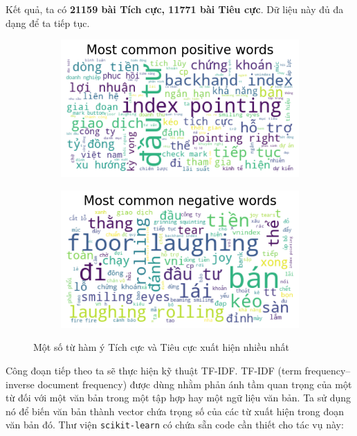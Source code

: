 Kết quả, ta có \textbf{21159 bài Tích cực, 11771 bài Tiêu cực}. Dữ liệu này đủ đa dạng để ta tiếp tục. 
\begin{figure}[H]
  \begin{subfigure}{.5\textwidth}
  \centering
    \includegraphics[width=1\linewidth]{images/plot-5.8-commonpos.png}
  \end{subfigure}%
  \begin{subfigure}{.5\textwidth}
  \centering
    \includegraphics[width=1\linewidth]{images/plot-5.9-commonneg.png}
  \end{subfigure}
  \vspace{-2em}
  \caption{Một số từ hàm ý Tích cực và Tiêu cực xuất hiện nhiều nhất}
  \label{fig:5.11}
\end{figure}

Công đoạn tiếp theo ta sẽ thực hiện kỹ thuật TF-IDF. TF-IDF (term frequency–inverse document frequency) được dùng nhằm phản ánh tầm quan trọng của một từ đối với một văn bản trong một tập hợp hay một ngữ liệu văn bản. Ta sử dụng nó để biến văn bản thành vector chứa trọng số của các từ xuất hiện trong đoạn văn bản đó. Thư viện \texttt{scikit-learn} có chứa sẵn code cần thiết cho tác vụ này:

